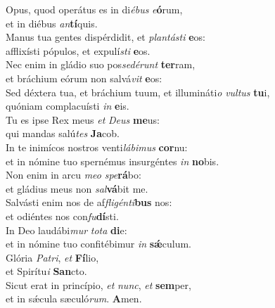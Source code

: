 \evenverse Opus, quod operátus es in di\textit{é}\textit{bus} \textit{e}\textbf{ó}rum,~\*\\
\evenverse et in diébus \textit{an}\textbf{tí}quis.\\
\oddverse Manus tua gentes dispérdidit, et \textit{plan}\textit{tá}\textit{sti} \textbf{e}os:~\*\\
\oddverse afflixísti pópulos, et expulí\textit{sti} \textbf{e}os.\\
\evenverse Nec enim in gládio suo pos\textit{se}\textit{dé}\textit{runt} \textbf{ter}ram,~\*\\
\evenverse et bráchium eórum non salvá\textit{vit} \textbf{e}os:\\
\oddverse Sed déxtera tua, et bráchium tuum, et illumináti\textit{o} \textit{vul}\textit{tus} \textbf{tu}i,~\*\\
\oddverse quóniam complacuísti \textit{in} \textbf{e}is.\\
\evenverse Tu es ipse Rex meus \textit{et} \textit{De}\textit{us} \textbf{me}us:~\*\\
\evenverse qui mandas salú\textit{tes} \textbf{Ja}cob.\\
\oddverse In te inimícos nostros venti\textit{lá}\textit{bi}\textit{mus} \textbf{cor}nu:~\*\\
\oddverse et in nómine tuo spernémus insurgéntes \textit{in} \textbf{no}bis.\\
\evenverse Non enim in arcu \textit{me}\textit{o} \textit{spe}\textbf{rá}bo:~\*\\
\evenverse et gládius meus non \textit{sal}\textbf{vá}bit me.\\
\oddverse Salvásti enim nos de af\textit{fli}\textit{gén}\textit{ti}\textbf{bus} nos:~\*\\
\oddverse et odiéntes nos con\textit{fu}\textbf{dí}sti.\\
\evenverse In Deo laudábi\textit{mur} \textit{to}\textit{ta} \textbf{di}e:~\*\\
\evenverse et in nómine tuo confitébimur \textit{in} \textbf{sǽ}culum.\\
\oddverse Glória \textit{Pa}\textit{tri}, \textit{et} \textbf{Fí}lio,~\*\\
\oddverse et Spirítu\textit{i} \textbf{San}cto.\\
\evenverse Sicut erat in princípio, \textit{et} \textit{nunc}, \textit{et} \textbf{sem}per,~\*\\
\evenverse et in sǽcula sæculó\textit{rum}. \textbf{A}men.\\
